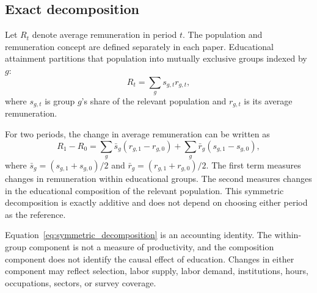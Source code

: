\subsection{Exact decomposition}

Let \(R_t\) denote average remuneration in period \(t\). The population and
remuneration concept are defined separately in each paper. Educational
attainment partitions that population into mutually exclusive groups indexed by
\(g\):
\begin{equation}
  R_t = \sum_g s_{g,t} r_{g,t},
  \label{eq:remuneration_identity}
\end{equation}
where \(s_{g,t}\) is group \(g\)'s share of the relevant population and
\(r_{g,t}\) is its average remuneration.

For two periods, the change in average remuneration can be written as
\begin{equation}
  R_1-R_0 =
  \sum_g \bar{s}_g\left(r_{g,1}-r_{g,0}\right)
  +
  \sum_g \bar{r}_g\left(s_{g,1}-s_{g,0}\right),
  \label{eq:symmetric_decomposition}
\end{equation}
where
\(\bar{s}_g=(s_{g,1}+s_{g,0})/2\) and
\(\bar{r}_g=(r_{g,1}+r_{g,0})/2\).
The first term measures changes in remuneration within educational groups. The
second measures changes in the educational composition of the relevant
population. This symmetric decomposition is exactly additive and does not
depend on choosing either period as the reference.

Equation~\eqref{eq:symmetric_decomposition} is an accounting identity. The
within-group component is not a measure of productivity, and the composition
component does not identify the causal effect of education. Changes in either
component may reflect selection, labor supply, labor demand, institutions,
hours, occupations, sectors, or survey coverage.
